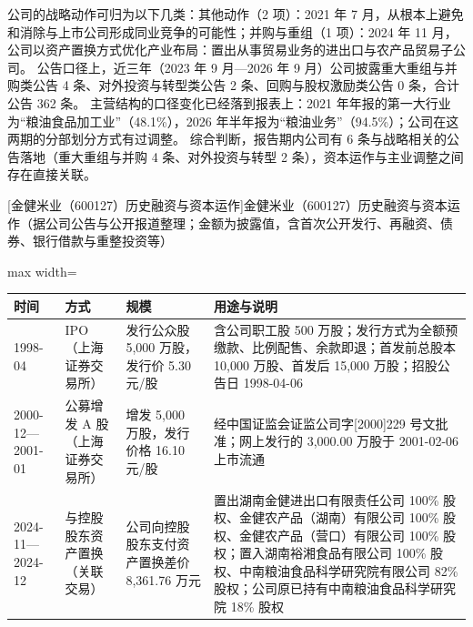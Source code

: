  公司的战略动作可归为以下几类：其他动作（2 项）：2021 年 7 月，从根本上避免和消除与上市公司形成同业竞争的可能性；并购与重组（1 项）：2024 年 11 月，公司以资产置换方式优化产业布局：置出从事贸易业务的进出口与农产品贸易子公司。 公告口径上，近三年（2023 年 9 月---2026 年 9 月）公司披露重大重组与并购类公告 4 条、对外投资与转型类公告 2 条、回购与股权激励类公告 0 条，合计公告 362 条。 主营结构的口径变化已经落到报表上：2021 年年报的第一大行业为“粮油食品加工业”（48.1\%），2026 年半年报为“粮油业务”（94.5\%）；公司在这两期的分部划分方式有过调整。 综合判断，报告期内公司有 6 条与战略相关的公告落地（重大重组与并购 4 条、对外投资与转型 2 条），资本运作与主业调整之间存在直接关联。

\begin{center}\small\setlength{\tabcolsep}{4pt}
[金健米业（600127）历史融资与资本运作]{金健米业（600127）历史融资与资本运作（据公司公告与公开报道整理；金额为披露值，含首次公开发行、再融资、债券、银行借款与重整投资等）}
\begin{adjustbox}{max width=\textwidth}
\begin{tabular}{@{}p{1.45cm}p{2.55cm}p{4.05cm}p{4.95cm}@{}}
\toprule
时间 & 方式 & 规模 & 用途与说明 \\
\midrule
1998-04 & IPO（上海证券交易所） & 发行公众股 5,\allowbreak{}000 万股，\allowbreak{}发行价 5.30 元/\allowbreak{}股 & 含公司职工股 500 万股；发行方式为全额预缴款、\allowbreak{}比例配售、\allowbreak{}余款即退；首发前总股本 10,\allowbreak{}000 万股、\allowbreak{}首发后 15,\allowbreak{}000 万股；招股公告日 1998-04-06 \\
2000-12—2001-01 & 公募增发 A 股（上海证券交易所） & 增发 5,\allowbreak{}000 万股，\allowbreak{}发行价格 16.10 元/\allowbreak{}股 & 经中国证监会证监公司字[2000]229 号文批准；网上发行的 3,\allowbreak{}000.00 万股于 2001-02-06 上市流通 \\
2024-11—2024-12 & 与控股股东资产置换（关联交易） & 公司向控股股东支付资产置换差价 8,\allowbreak{}361.76 万元 & 置出湖南金健进出口有限责任公司 100\% 股权、\allowbreak{}金健农产品（湖南）有限公司 100\% 股权、\allowbreak{}金健农产品（营口）有限公司 100\% 股权；置入湖南裕湘食品有限公司 100\% 股权、\allowbreak{}中南粮油食品科学研究院有限公司 82\% 股权；公司原已持有中南粮油食品科学研究院 18\% 股权 \\
\bottomrule
\end{tabular}
\end{adjustbox}
\end{center}

